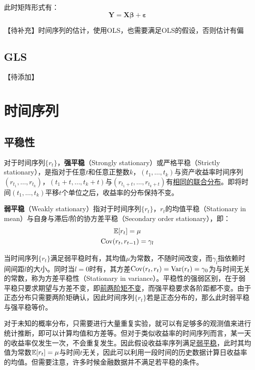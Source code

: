 \documentclass[11pt]{article}
\begin{document}
此时矩阵形式有：
\begin{equation*}
    \bm{Y} = \bm{X} \bm{\beta} + \bm{\varepsilon}
\end{equation*}

【待补充】时间序列的估计，使用OLS，也需要满足OLS的假设，否则估计有偏


\subsection{GLS}

【待添加】

\section{时间序列}

\subsection{平稳性}

对于时间序列$\{r_t\}$，\textbf{强平稳}（Strongly stationary）或严格平稳（Strictly stationary），是指对于任意$t$和任意正整数$k$，$(t_1,\dots,t_k)$与资产收益率时间序列$(r_{t_1},\dots,r_{t_k})$，$(t_1+t,\dots,t_k+t)$与$(r_{t_1+t},\dots,r_{t_k+t})$有\uline{相同的联合分布}。即将时间$(t_1,\dots,t_k)$平移$t$个单位之后，收益率的分布保持不变。

\textbf{弱平稳}（Weakly stationary）指对于时间序列$\{r_t\}$，$r_t$的均值平稳（Stationary in mean）与自身与滞后$l$阶的协方差平稳（Secondary order stationary），即：
\begin{gather*}
    \mathbb{E} [r_t] = \mu \\
    \operatorname{Cov} (r_t, r_{t-1}) = \gamma_l
\end{gather*}

当时间序列$\{r_t\}$满足弱平稳时有，其均值$\mu$为常数，不随时间改变，而$\gamma_l$指依赖时间间距$l$的大小。同时当$l=0$时有，其方差$\operatorname{Cov}(r_t,r_t) = \operatorname{Var}(r_t) = \gamma_0$为与时间无关的常数，称为方差平稳性（Stationary in variance）。平稳性的强弱区别，在于弱平稳只要求期望与方差不变，即\uline{前两阶矩不变}，而强平稳要求各阶距都不变。由于正态分布只需要两阶矩确认，因此时间序列$\{r_t\}$若是正态分布的，那么此时弱平稳与强平稳等价。

对于未知的概率分布，只需要进行大量重复实验，就可以有足够多的观测值来进行统计推断，即可以计算均值和方差等。但对于类似收益率的时间序列而言，某一天的收益率仅发生一次，不会重复发生。因此假设收益率序列满足\uline{弱平稳}，此时其均值为常数$\mathbb{E}[r_t] = \mu$与时间$t$无关，因此可以利用一段时间的历史数据计算日收益率的均值。但需要注意，许多时候金融数据并不满足若平稳的条件。
\end{document}
